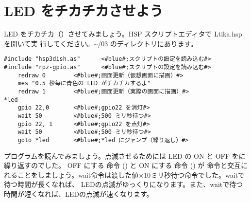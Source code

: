\section{LED をチカチカさせよう}

LED をチカチカ（）させてみましょう。HSP スクリプトエディタで Ltika.hsp を開いて実
行してください。\textasciitilde /03 のディレクトリにあります。\\

\begin{lstlisting}[caption=\textasciitilde/03/Ltika.hsp,label=Ltika.hsp]
#include "hsp3dish.as"		<#blue#;スクリプトの設定を読み込む#>
#include "rpz-gpio.as"		<#blue#;スクリプトの設定を読み込む#>
	redraw 0		<#blue#;画面更新（仮想画面に描画）#>
	mes "0.5 秒毎に青色の LED がチカチカするよ"
	redraw 1		<#blue#;画面更新（実際の画面に描画）#>
*led
	gpio 22,0		<#blue#;gpio22 を消灯#>
	wait 50 		<#blue#;500 ミリ秒待つ#>
	gpio 22, 1 		<#blue#;gpio22 を点灯#>
	wait 50 		<#blue#;500 ミリ秒待つ#>
	goto *led 		<#blue#;*led にジャンプ（繰り返し）#>
\end{lstlisting}

プログラムを読んでみましょう。点滅させるためには LED の ON と OFF をに繰り返すのでした。
OFF にする  命令 () と ON にする  命令 () が  命令と交互に
れることをしましょう。wait命令は渡した値$\times 10$ミリ秒待つ命令でした。waitで待つ時間が長くなれば、
LEDの点滅がゆっくりになります。また、waitで待つ時間が短くなれば、LEDの点滅が速くなります。

\begin{tcolorbox}[title=\useOmetoi]
	\begin{enumerate}
	\end{enumerate}
\end{tcolorbox}
